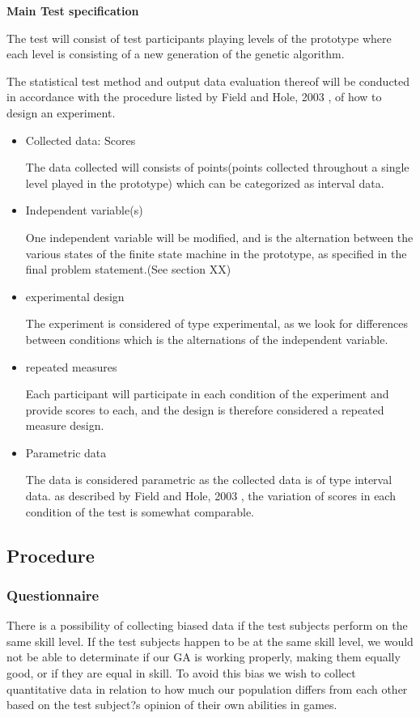 \newpage
\textbf{Main Test specification}

The test will consist of test participants playing levels of the prototype where each level is consisting of a new generation of the genetic algorithm.

The statistical test method and output data evaluation thereof will be conducted in accordance with the procedure listed by Field and Hole, 2003 \cite[pp. 265-277]{Field2003}, of how to design an experiment.

\begin{itemize}
\item Collected data: Scores

The data collected will consists of points(points collected throughout a single level played in the prototype) which can be categorized as interval data.
\item Independent variable(s)

One independent variable will be modified, and is the alternation between the various states of the finite state machine in the prototype, as specified in the final problem statement.(See section XX)
\item experimental design

The experiment is considered of type experimental, as we look for differences between conditions which is the alternations of the independent variable.
\item repeated measures

Each participant will participate in each condition of the experiment and provide scores to each, and the design is therefore considered a repeated measure design.
\item Parametric data

The data is considered parametric as the collected data is of type interval data. as described by Field and Hole, 2003 \cite[pp. 269]{Field2003}, the variation of scores in each condition of the test is somewhat comparable.

\end{itemize}




\subsection{Procedure}

\subsubsection{Questionnaire}
There is a possibility of collecting biased data if the test subjects perform on the same skill level.
If the test subjects happen to be at the same skill level, we would not be able to determinate if our GA is working properly, making them equally good, or if they are equal in skill. To avoid this bias we wish to collect quantitative data in relation to how much our population differs from each other based on the test subject?s opinion of their own abilities in games.

